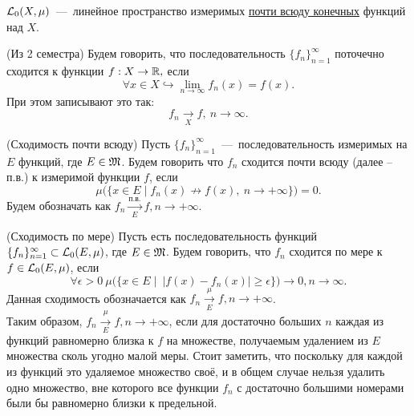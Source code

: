 \begin{definition}
    $\mathcal{L}_0(X, \mu)$~---~линейное пространство измеримых \underline{почти всюду конечных} функций над $X$.
\end{definition}

\begin{reminder} (Из 2 семестра)
    Будем говорить, что последовательность  $\{f_n\}_{n = 1}^\infty$ поточечно сходится к функции $f : X \rightarrow \mathbb{R},$ если
    $$\forall x \in X \hookrightarrow \lim_{n \rightarrow \infty} f_n(x) = f(x).$$
    При этом записывают это так:
    $$f_n \underset{X}{\rightarrow} f, \ n\rightarrow \infty.$$
\end{reminder}


\begin{definition} (Сходимость почти всюду)
    Пусть $\{f_n\}_{n = 1}^\infty$~---~последовательность измеримых на $E$ функций, где $E \in \mathfrak{M}$. Будем говорить что $f_n$ сходится почти всюду (далее -- п.в.) к измеримой функции $f$, если $$\mu\Big(\{x \in E \mid f_n(x) \not\rightarrow f(x), \ n \rightarrow +\infty\}\Big) = 0.$$ Будем обозначать как $f_n \xrightarrow[E]{\text{п.в.}} f, n \rightarrow +\infty$.
\end{definition}

\begin{definition} (Сходимость по мере)
    Пусть есть последовательность функций $\{f_n\}_{n = 1}^\infty \subset \mathcal{L}_0(E, \mu)$, где $E \in \mathfrak{M}$. Будем говорить, что $f_n$ сходится по мере к $f \in \mathcal{L}_0(E, \mu)$, если $$\forall \epsilon > 0 \  \mu\Big(\{x \in E \mid \ | f(x) - f_n(x)| \geq \epsilon \}\Big) \xrightarrow{} 0, n \rightarrow \infty.$$
    Данная сходимость обозначается как $f_n \xrightarrow[E]{\mu} f, n \rightarrow +\infty$. \\
    Таким образом, $f_n \xrightarrow[E]{\mu} f, n \rightarrow +\infty$, если для достаточно больших $n$ каждая из функций равномерно близка к $f$ на множестве, получаемым удалением из $E$ множества сколь угодно малой меры. Стоит заметить, что поскольку для каждой из функций это удаляемое множество своё, и в общем случае нельзя удалить одно множество, вне которого все функции $f_n$ с достаточно большими номерами были бы равномерно близки к предельной.
\end{definition}

